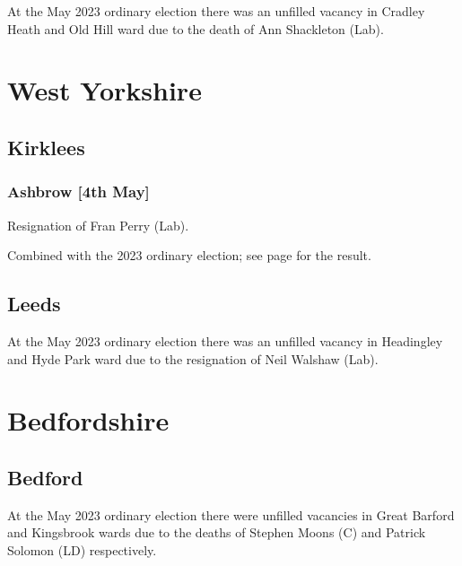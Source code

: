 \documentclass[a4paper,openany]{book}
\begin{document}
\begin{resultsiii}
At the May 2023 ordinary election there was an unfilled vacancy in Cradley Heath and Old Hill ward due to the death of Ann Shackleton (Lab).%

\section{West Yorkshire}

\subsection*{Kirklees}

\subsubsection*{Ashbrow \hspace*{\fill}\nolinebreak[1]%
	\enspace\hspace*{\fill}
	[4th May]}


Resignation of Fran Perry (Lab).

Combined with the 2023 ordinary election; see page \pageref{KirkleesAshbrow} for the result.

\subsection*{Leeds}

At the May 2023 ordinary election there was an unfilled vacancy in Headingley and Hyde Park ward due to the resignation of Neil Walshaw (Lab).%

\section{Bedfordshire}

\subsection*{Bedford}

At the May 2023 ordinary election there were unfilled vacancies in Great Barford and Kingsbrook wards due to the deaths of Stephen Moons (C) and Patrick Solomon (LD) respectively.%
%


\end{resultsiii}
\end{document}
